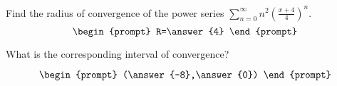 \documentclass{ximera}
\author{Gregory Hartman \and Matthew Carr}
\begin{document}
\begin{exercise}




Find the radius of convergence of the power series $\sum_{n=0}^{\infty}n^{2}\left(\frac{x+4}{4}\right)^n$.
\[
\begin{prompt}
R=\answer{4}
\end{prompt}
\]

What is the corresponding interval of convergence?

\[
\begin{prompt}
(\answer{-8},\answer{0})
\end{prompt}
\]

\end{exercise}
\end{document}

